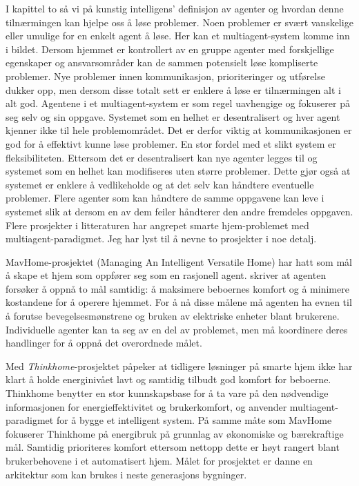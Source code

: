 {I kapittel to så vi på kunstig intelligens' definisjon av agenter og hvordan denne tilnærmingen kan hjelpe oss å løse problemer. Noen problemer er svært vanskelige eller umulige for en enkelt agent å løse. Her kan et multiagent-system komme inn i bildet. Dersom hjemmet er kontrollert av en gruppe agenter med forskjellige egenskaper og ansvarsområder kan de sammen potensielt løse kompliserte problemer. Nye problemer innen kommunikasjon, prioriteringer og utførelse dukker opp, men dersom disse totalt sett er enklere å løse er tilnærmingen alt i alt god. Agentene i et multiagent-system er som regel uavhengige og fokuserer på seg selv og sin oppgave. Systemet som en helhet er desentralisert og hver agent kjenner ikke til hele problemområdet. Det er derfor viktig at kommunikasjonen er god for å effektivt kunne løse problemer. En stor fordel med et slikt system er fleksibiliteten. Ettersom det er desentralisert kan nye agenter legges til og systemet som en helhet kan modifiseres uten større problemer. Dette gjør også at systemet er enklere å vedlikeholde og at det selv kan håndtere eventuelle problemer. Flere agenter som kan håndtere de samme oppgavene kan leve i systemet slik at dersom en av dem feiler håndterer den andre fremdeles oppgaven. Flere prosjekter i litteraturen har angrepet smarte hjem-problemet med multiagent-paradigmet. Jeg har lyst til å nevne to prosjekter i noe detalj.

MavHome-prosjektet (Managing An Intelligent Versatile Home) har hatt som mål å skape et hjem som oppfører seg som en rasjonell agent. \citet{mavhome} skriver at agenten forsøker å oppnå to mål samtidig: å maksimere beboernes komfort og å minimere kostandene for å operere hjemmet. For å nå disse målene må agenten ha evnen til å forutse bevegelsesmønstrene og bruken av elektriske enheter blant brukerene. Individuelle agenter kan ta seg av en del av problemet, men må koordinere deres handlinger for å oppnå det overordnede målet.

Med \emph{Thinkhome}-prosjektet påpeker \citet{thinkhome} at tidligere løsninger på smarte hjem ikke har klart å holde energinivået lavt og samtidig tilbudt god komfort for beboerne. Thinkhome benytter en stor kunnskapsbase for å ta vare på den nødvendige informasjonen for energieffektivitet og brukerkomfort, og anvender multiagent-paradigmet for å bygge et intelligent system. På samme måte som MavHome fokuserer Thinkhome på energibruk på grunnlag av økonomiske og bærekraftige mål. Samtidig prioriteres komfort ettersom nettopp dette er høyt rangert blant brukerbehovene i et automatisert hjem. Målet for prosjektet er danne en arkitektur som kan brukes i neste generasjons bygninger.

}
